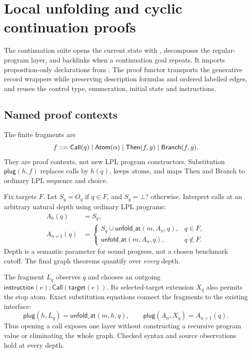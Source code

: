 \section{Local unfolding and cyclic continuation proofs}\label{sec:local-proofs}

The continuation suite opens the current state with ,
decomposes the regular-program layer, and backlinks when a continuation
goal repeats. It imports proposition-only declarations from .
The proof functor transports the generative record wrappers while preserving
description formulas and ordered labelled edges, and reuses the control
type, enumeration, initial state and instructions.

\subsection{Named proof contexts}
The finite fragments are
\[
 f\mathrel{::=}\mathsf{Call}(q)\mid\mathsf{Atom}(\alpha)
       \mid\mathsf{Then}(f,g)\mid\mathsf{Branch}(f,g).
\]
They are proof contexts, not new LPL program constructors. Substitution
$\mathsf{plug}(h,f)$ replaces calls by $h(q)$, keeps atoms, and maps Then
and Branch to ordinary LPL sequence and choice.

Fix targets $F$. Let $S_q=O_q$ if $q\in F$, and $S_q=\bot?$ otherwise.
Interpret calls at an arbitrary natural depth using ordinary LPL programs:
\begin{align*}
 A_0(q)&=S_q,\\
 A_{n+1}(q)&=\begin{cases}
 S_q\cup\mathsf{unfold\_at}(m,A_n,q),&q\in F,\\
 \mathsf{unfold\_at}(m,A_n,q),&q\notin F.
 \end{cases}
\end{align*}
Depth is a semantic parameter for sound progress, not a chosen benchmark
cutoff. The final graph theorems quantify over \emph{every} depth.

The fragment $L_q$ observes $q$ and chooses an outgoing
$\mathsf{instruction}(e);\mathsf{Call}(\mathsf{target}(e))$.
Its selected-target extension $X_q$ also permits the stop atom. Exact
substitution equations connect the fragments to the existing interface:
\[
 \mathsf{plug}(h,L_q)=\mathsf{unfold\_at}(m,h,q),\qquad
 \mathsf{plug}(A_n,X_q)=A_{n+1}(q).
\]
Thus opening a call exposes one layer without constructing a recursive
program value or eliminating the whole graph. Checked syntax and source
observations hold at every depth.

